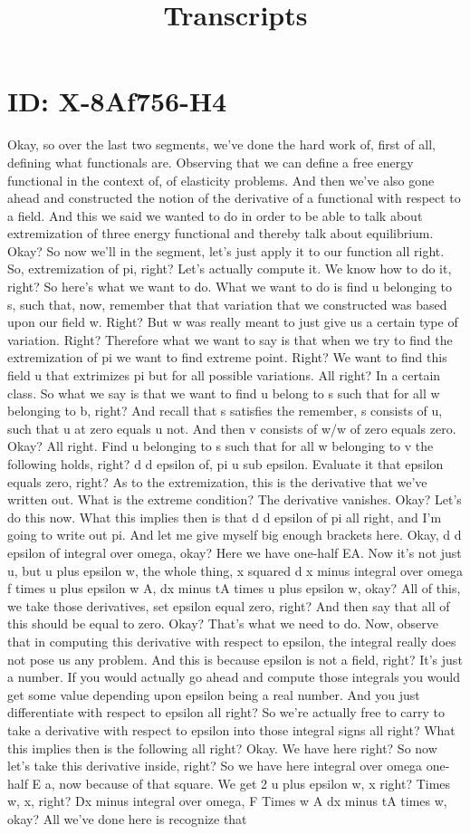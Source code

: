 \documentclass[10pt]{article}
\title{Transcripts}
\date{}
\begin{document}
\section*{ID: X-8Af756-H4}
Okay, so over the last two segments, we've done the hard work of, first of all, defining what functionals are. Observing that we can define a free energy functional in the context of, of elasticity problems. And then we've also gone ahead and constructed the notion of the derivative of a functional with respect to a field. And this we said we wanted to do in order to be able to talk about extremization of three energy functional and thereby talk about equilibrium. Okay? So now we'll in the segment, let's just apply it to our function all right. So, extremization of pi, right? Let's actually compute it. We know how to do it, right? So here's what we want to do. What we want to do is find u belonging to s, such that, now, remember that that variation that we constructed was based upon our field w. Right? But w was really meant to just give us a certain type of variation. Right? Therefore what we want to say is that when we try to find the extremization of pi we want to find extreme point. Right? We want to find this field u that extrimizes pi but for all possible variations. All right? In a certain class. So what we say is that we want to find u belong to s such that for all w belonging to b, right? And recall that s satisfies the remember, s consists of u, such that u at zero equals u not. And then v consists of w/w of zero equals zero. Okay? All right. Find u belonging to s such that for all w belonging to v the following holds, right? d d epsilon of, pi u sub epsilon. Evaluate it that epsilon equals zero, right? As to the extremization, this is the derivative that we've written out. What is the extreme condition? The derivative vanishes. Okay? Let's do this now. What this implies then is that d d epsilon of pi all right, and I'm going to write out pi. And let me give myself big enough brackets here. Okay, d d epsilon of integral over omega, okay? Here we have one-half EA. Now it's not just u, but u plus epsilon w, the whole thing, x squared d x minus integral over omega f times u plus epsilon w A, dx minus tA times u plus epsilon w, okay? All of this, we take those derivatives, set epsilon equal zero, right? And then say that all of this should be equal to zero. Okay? That's what we need to do. Now, observe that in computing this derivative with respect to epsilon, the integral really does not pose us any problem. And this is because epsilon is not a field, right? It's just a number. If you would actually go ahead and compute those integrals you would get some value depending upon epsilon being a real number. And you just differentiate with respect to epsilon all right? So we're actually free to carry to take a derivative with respect to epsilon into those integral signs all right? What this implies then is the following all right? Okay. We have here right? So now let's take this derivative inside, right? So we have here integral over omega one-half E a, now because of that square. We get 2 u plus epsilon w, x right? Times w, x, right? Dx minus integral over omega, F Times w A dx minus tA times w, okay? All we've done here is recognize that 
\end{document}
